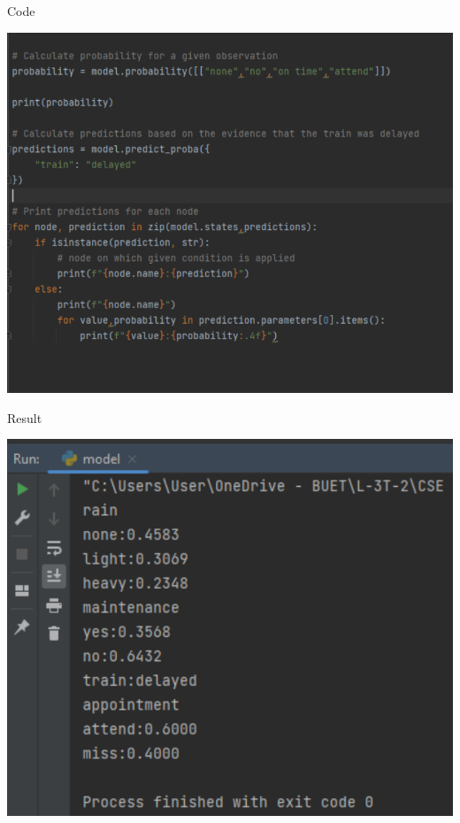 \documentclass{beamer}
\begin{document}
\begin{frame}{Code}
\begin{center}
    \includegraphics[scale=.5]{inference.png}
\end{center}
\end{frame}
\begin{frame}{Result}
\begin{center}
    \includegraphics[scale=.5]{result.png}
\end{center}
\end{frame}
\end{document}
